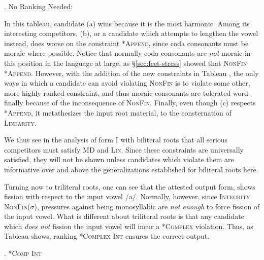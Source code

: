\documentclass[12pt,twoside,letterpaper]{article}
\begin{document}
\ex. No Ranking Needed:\\\begin{OTtableau}{7}
  \OTcandrow*[\OThand]{[(marr)]}{ , , ,*, ,*, }
  \OTcandrow*{[(maar)]}{ , , ,*,*!, , }
  \OTcandrow*{[(ramm)]}{ , , ,*, ,*,*!}
\end{OTtableau}

In this tableau, candidate (a) wins because it is the most harmonic. Among its interesting competitors, (b), or a candidate which attempts to lengthen the vowel instead, does worse on the constraint *\textsc{Append}, since coda consonants must be moraic where possible. Notice that normally coda consonants are \emph{not} moraic in this position in the language at large, as \S{\ref{sec:feet-stress}} showed that \textsc{NonFin} \OTdom \textsc{*Append}. However, with the addition of the new constraints in Tableau \Last, the only ways in which a candidate can avoid violating \textsc{NonFin} is to violate some other, more highly ranked constraint, and thus moraic consonants are tolerated word-finally because of the inconsequence of \textsc{NonFin}. Finally, even though (c) respects *\textsc{Append}, it metathesizes the input root material, to the consternation of \textsc{Linearity}.

We thus see in the analysis of form I with biliteral roots that all serious competitors must satisfy \textsc{MD} and \textsc{Lin}. Since these constraints are universally satisfied, they will not be shown unless candidates which violate them are informative over and above the generalizations established for biliteral roots here.

Turning now to triliteral roots, one can see that the attested output form, {\em {}} shows fission with respect to the input vowel /a/. Normally, however, since \textsc{Integrity} \OTdom \textsc{NonFin}($\sigma$), pressures against being monosyllabic are \emph{not enough} to force fission of the input vowel. What is different about triliteral roots is that any candidate which \emph{does not} fission the input vowel will incur a *\textsc{Complex} violation. Thus, as Tableau \NNext shows, ranking \textsc{*Complex} \OTdom \textsc{Int} ensures the correct output.

\ex. \textsc{*Comp} \OTdom \textsc{Int}\\\begin{OTtableau}{4}
\OTcandrow*{[(faQl)]}{*!, ,*,*}
\OTcandrow*{[(fQal)]}{*!, ,*,*}
\end{OTtableau}
\end{document}
